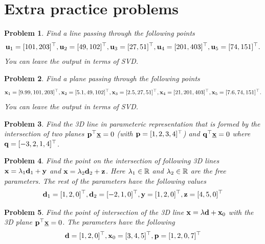 \documentclass{article}
\newtheorem{prob}{Problem}
\begin{document}
\section*{Extra practice problems}

\begin{prob}
  Find a line passing through the following points 
  \begin{align*}
    \mathbf{u}_1 = [101, 203]^\top,
    \mathbf{u}_2 = [49, 102]^\top,
    \mathbf{u}_3 = [27, 51]^\top,
    \mathbf{u}_4 = [201, 403]^\top,
    \mathbf{u}_5 = [74, 151]^\top.
    \end{align*}
    You can leave the output in terms of SVD.
\end{prob}

\begin{prob}
  Find a plane passing through the following points 
  \begin{align*}
    \mathbf{x}_1 = [9.99, 101, 203]^\top,
    \mathbf{x}_2 = [5.1, 49, 102]^\top,
    \mathbf{x}_3 = [2.5, 27, 51]^\top,
    \mathbf{x}_4 = [21, 201, 403]^\top,
    \mathbf{x}_5 = [7.6, 74, 151]^\top.
  \end{align*}
  You can leave the output in terms of SVD.
\end{prob}

\begin{prob}
  Find the 3D line in parameteric representation that is formed by the intersection of two planes $\mathbf{p}^\top \underline{\mathbf{x}} = 0$ (with $\mathbf{p} = [1, 2,
  3, 4]^\top$)  and $\mathbf{q}^\top \underline{\mathbf{x}} = 0$ where $\mathbf{q} = [-3, 2, 1, 4]^\top$.
\end{prob}

\begin{prob}
  Find the point on the intersection of following 3D lines $\mathbf{x} = \lambda_1
  \mathbf{d}_1 +  \mathbf{y}$ and $\mathbf{x} = \lambda_2 \mathbf{d}_2 + \mathbf{z}$. Here $\lambda_1\in \mathbb{R}$ and
  $\lambda_2 \in \mathbb{R}$ are the free parameters. The rest of the parameters have
  the following values
  \begin{align*}
    \mathbf{d}_1 = [1, 2, 0]^\top,
    \mathbf{d}_2 = [-2, 1, 0]^\top,
    \mathbf{y} = [1, 2, 0]^\top,
    \mathbf{z} = [4, 5, 0]^\top
    \end{align*}
\end{prob}

\begin{prob}
  Find the point of intersection of the 3D line $\mathbf{x} = \lambda \mathbf{d} + \mathbf{x}_0$ with
  the 3D plane $\mathbf{p}^\top \underline{\mathbf{x}} = 0$. The parameters have the
  following
  \begin{align*}
    \mathbf{d} = [1, 2, 0]^\top, \mathbf{x}_0 = [3, 4, 5]^\top, \mathbf{p} = [1, 2, 0, 7]^\top
  \end{align*}
\end{prob}
\end{document}
